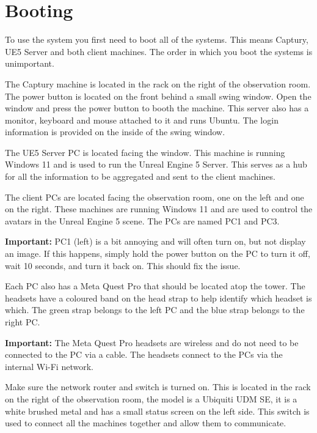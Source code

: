\section{Booting}
To use the system you first need to boot all of the systems. This means Captury, UE5 Server and both client machines. The order in which you boot the systems is unimportant.

The Captury machine is located in the rack on the right of the observation room. The power button is located on the front behind a small swing window. Open the window and press the power button to booth the machine. This server also has a monitor, keyboard and mouse attached to it and runs Ubuntu. The login information is provided on the inside of the swing window.

The UE5 Server PC is located facing the window. This machine is running Windows 11 and is used to run the Unreal Engine 5 Server. This serves as a hub for all the information to be aggregated and sent to the client machines.

The client PCs are located facing the observation room, one on the left and one on the right. These machines are running Windows 11 and are used to control the avatars in the Unreal Engine 5 scene. The PCs are named PC1 and PC3.

\begin{tcolorbox}
    \textbf{Important:} PC1 (left) is a bit annoying and will often turn on, but not display an image. If this happens, simply hold the power button on the PC to turn it off, wait 10 seconds, and turn it back on. This should fix the issue.
\end{tcolorbox}

Each PC also has a Meta Quest Pro that should be located atop the tower. The headsets have a coloured band on the head strap to help identify which headset is which. The green strap belongs to the left PC and the blue strap belongs to the right PC.

\begin{tcolorbox}
    \textbf{Important:} The Meta Quest Pro headsets are wireless and do not need to be connected to the PC via a cable. The headsets connect to the PCs via the internal Wi-Fi network.
\end{tcolorbox}

Make sure the network router and switch is turned on. This is located in the rack on the right of the observation room, the model is a Ubiquiti UDM SE, it is a white brushed metal and has a small status screen on the left side. This switch is used to connect all the machines together and allow them to communicate.

